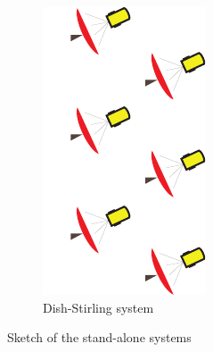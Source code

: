 \begin{figure}[htbp]
\begin{subfigure}[b]{0.26\columnwidth}
	\includegraphics[width = \columnwidth]{fig/Dish-s}
	\caption{Dish-Stirling system}\label{fig:DishStirling}
	\end{subfigure}
	
	\caption{Sketch of the stand-alone systems}\label{fig:Stand-alone-systems}
\end{figure}


